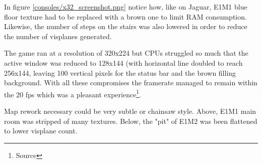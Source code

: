 In figure \ref{consoles/x32_screenshot.png} notice how, like on Jaguar, E1M1 blue floor texture had to be replaced with a brown one to limit RAM consumption. Likewise, the number of steps on the stairs was also lowered in order to reduce the number of visplanes generated.\\
\par
The game ran at a resolution of 320x224 but CPUs struggled so much that the active window was reduced to 128x144 (with horizontal line doubled to reach 256x144, leaving 100 vertical pixels for the status bar and the brown filling background. With all these compromises the framerate managed to remain within the 20 fps which was a pleasant experience\footnote{Source}.\\
\par
{}



\par
Map rework necessary could be very subtle or chainsaw style. Above, E1M1 main room was stripped of many textures. Below, the "pit" of E1M2 was been flattened to lower visplane count.\\
\par
{}





